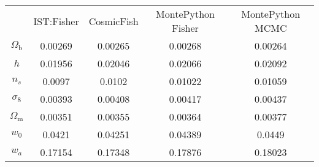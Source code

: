 \begin{table}
\centering
\begin{tabular}{|c|c|c|c|c|}
 & IST:Fisher & CosmicFish & MontePython Fisher & MontePython MCMC \\
$\Omega_\mathrm{b}$ & 0.00269 & 0.00265 & 0.00268 & 0.00264 \\
$h$ & 0.01956 & 0.02046 & 0.02066 & 0.02092 \\
$n_s$ & 0.0097 & 0.0102 & 0.01022 & 0.01059 \\
$\sigma_8$ & 0.00393 & 0.00408 & 0.00417 & 0.00437 \\
$\Omega_\mathrm{m}$ & 0.00351 & 0.00355 & 0.00364 & 0.00377 \\
$w_0$ & 0.0421 & 0.04251 & 0.04389 & 0.0449 \\
$w_a$ & 0.17154 & 0.17348 & 0.17876 & 0.18023 \\
\end{tabular}
\end{table}
